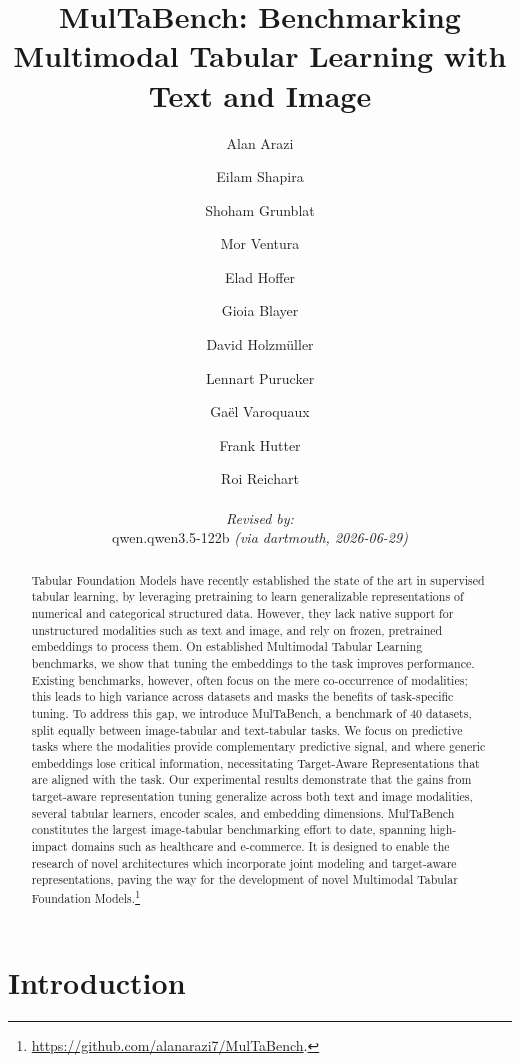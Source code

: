 \documentclass{article}
\title{MulTaBench: Benchmarking Multimodal Tabular Learning with Text and Image}
\author{
  Alan Arazi \and Eilam Shapira \and Shoham Grunblat \and Mor Ventura \and Elad Hoffer \and Gioia Blayer \and David Holzmüller \and Lennart Purucker \and Gaël Varoquaux \and Frank Hutter \and Roi Reichart
  \par\hrule\par
  \textit{Revised by:}\\
  qwen.qwen3.5-122b \textit{(via dartmouth, 2026-06-29)}
}
\begin{document}
\maketitle


\begin{abstract}
Tabular Foundation Models have recently established the state of the art in supervised tabular learning, by leveraging pretraining to learn generalizable representations of numerical and categorical structured data. However, they lack native support for unstructured modalities such as text and image, and rely on frozen, pretrained embeddings to process them. On established Multimodal Tabular Learning benchmarks, we show that tuning the embeddings to the task improves performance. Existing benchmarks, however, often focus on the mere co-occurrence of modalities; this leads to high variance across datasets and masks the benefits of task-specific tuning. To address this gap, we introduce MulTaBench, a benchmark of 40 datasets, split equally between image-tabular and text-tabular tasks. We focus on predictive tasks where the modalities provide complementary predictive signal, and where generic embeddings lose critical information, necessitating Target-Aware Representations that are aligned with the task. Our experimental results demonstrate that the gains from target-aware representation tuning generalize across both text and image modalities, several tabular learners, encoder scales, and embedding dimensions. MulTaBench constitutes the largest image-tabular benchmarking effort to date, spanning high-impact domains such as healthcare and e-commerce. It is designed to enable the research of novel architectures which incorporate joint modeling and target-aware representations, paving the way for the development of novel Multimodal Tabular Foundation Models.\footnote{\url{https://github.com/alanarazi7/MulTaBench}.}
\end{abstract}


\section{Introduction}
\label{sec:introduction}
\end{document}
